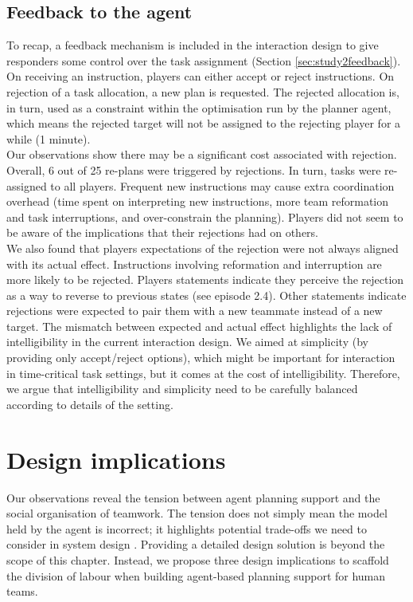 \subsection{Feedback to the agent}\label{sec:studytwofeedback}

To recap, a feedback mechanism is included in the interaction design to give responders some control over the task assignment (Section \ref{sec:study2feedback}). On receiving an instruction, players can either accept or reject instructions. On rejection of a task allocation, a new plan is requested. The rejected allocation is, in turn, used as a constraint within the optimisation run by the planner agent, which means the rejected target will not be assigned to the rejecting player for a while (1 minute). \\

Our observations show there may be a significant cost associated with rejection. Overall, 6 out of 25 re-plans were triggered by rejections. In turn, tasks were re-assigned to all players. Frequent new instructions may cause extra coordination overhead (time spent on interpreting new instructions, more team reformation and task interruptions, and over-constrain the planning). Players did not seem to be aware of the implications that their rejections had on others.\\
 
We also found that players expectations of the rejection were not always aligned with its actual effect. Instructions involving reformation and interruption are more likely to be rejected. Players statements indicate they perceive the rejection as a way to reverse to previous states (see episode 2.4). Other statements indicate rejections were expected to pair them with a new teammate instead of a new target. The mismatch between expected and actual effect highlights the lack of intelligibility in the current interaction design. We aimed at simplicity (by providing only accept/reject options), which might be important for interaction in time-critical task settings, but it comes at the cost of intelligibility. Therefore, we argue that intelligibility and simplicity need to be carefully balanced according to details of the setting.\\


\section{Design implications}

Our observations reveal the tension between agent planning support and the social organisation of teamwork. The tension does not simply mean the model held by the agent is incorrect; it highlights potential trade-offs we need to consider in system design \cite{Bowers1994,Sukthankar}. Providing a detailed design solution is beyond the scope of this chapter. Instead, we propose three design implications to scaffold the division of labour when building agent-based planning support for human teams.\\

